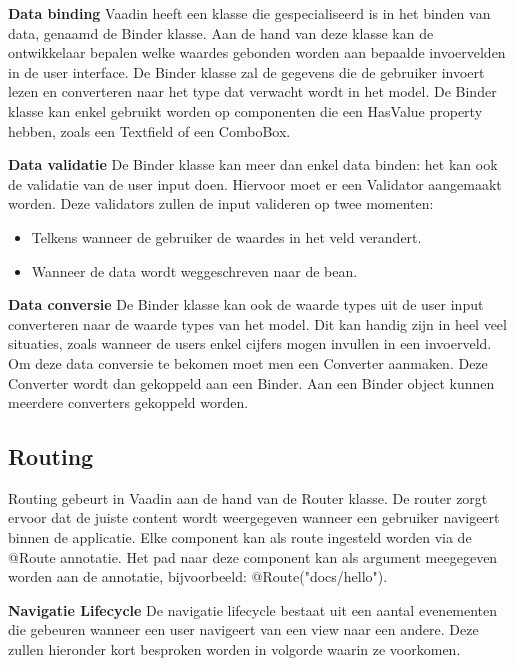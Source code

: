 \textbf{Data binding} \hspace{1cm} Vaadin heeft een klasse die gespecialiseerd is in het binden van data, genaamd de Binder klasse. Aan de hand van deze klasse kan de ontwikkelaar bepalen welke waardes gebonden worden aan bepaalde invoervelden in de user interface. De Binder klasse zal de gegevens die de gebruiker invoert lezen en converteren naar het type dat verwacht wordt in het model. De Binder klasse kan enkel gebruikt worden op componenten die een HasValue property hebben, zoals een Textfield of een ComboBox. 

\textbf{Data validatie} \hspace{1cm} De Binder klasse kan meer dan enkel data binden: het kan ook de validatie van de user input doen. Hiervoor moet er een Validator aangemaakt worden. Deze validators zullen de input valideren op twee momenten: 
\begin{itemize}
	\item Telkens wanneer de gebruiker de waardes in het veld verandert.
	\item Wanneer de data wordt weggeschreven naar de bean. 
\end{itemize}

\textbf{Data conversie} \hspace{1cm} De Binder klasse kan ook de waarde types uit de user input converteren naar de waarde types van het model. Dit kan handig zijn in heel veel situaties, zoals wanneer de users enkel cijfers mogen invullen in een invoerveld.
Om deze data conversie te bekomen moet men een Converter aanmaken. Deze Converter wordt dan gekoppeld aan een Binder. Aan een Binder object kunnen meerdere converters gekoppeld worden. 

\subsection{Routing}
Routing gebeurt in Vaadin aan de hand van de Router klasse. De router zorgt ervoor dat de juiste content wordt weergegeven wanneer een gebruiker navigeert binnen de applicatie. Elke component kan als route ingesteld worden via de @Route annotatie. 
Het pad naar deze component kan als argument meegegeven worden aan de annotatie, bijvoorbeeld: @Route("docs/hello").

\textbf{Navigatie Lifecycle} \hspace{1cm} De navigatie lifecycle bestaat uit een aantal evenementen die gebeuren wanneer een user navigeert van een view naar een andere. Deze zullen hieronder kort besproken worden in volgorde waarin ze voorkomen. 

